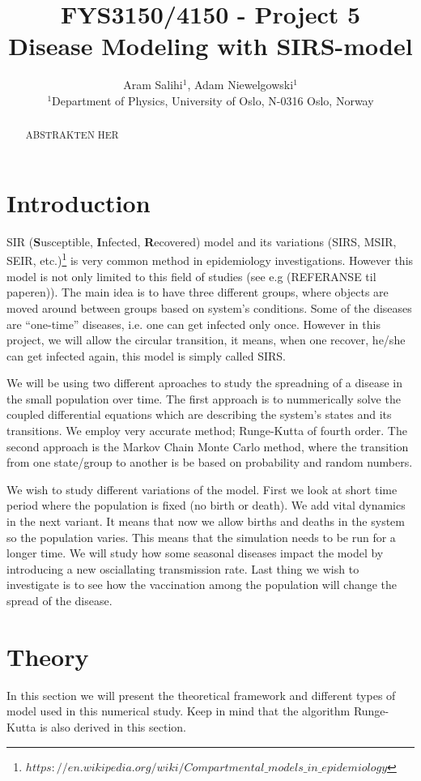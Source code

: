 \documentclass[a4paper, 10pt]{article}
\title{FYS3150/4150 - Project 5 \\
  Disease Modeling with SIRS-model}
\author{Aram Salihi$^1$, Adam Niewelgowski$^1$ \\
  \small $^1$Department of Physics, University of Oslo, N-0316 Oslo, Norway}
\begin{document}
\maketitle
\begin{abstract}
ABSTRAKTEN HER
\end{abstract}
\tableofcontents
\newpage
\section{Introduction}
SIR (\textbf{S}usceptible, \textbf{I}nfected, \textbf{R}ecovered) model and its
variations (SIRS, MSIR, SEIR, etc.)\footnote{$https://en.wikipedia.org/wiki/Compartmental\_models\_in\_epidemiology$}
is very common method in epidemiology investigations. However this model is not only
limited to this field of studies (see e.g (REFERANSE til paperen)). The main
idea is to have three different groups, where objects are moved around between
groups based on system's conditions.
Some of the diseases are ``one-time'' diseases, i.e. one can get infected only
once. However in this project, we will allow the circular transition, it means,
when one recover, he/she can get infected again, this model is simply called
SIRS.\@

We will be using two different aproaches to study the spreadning
of a disease in the small population over time. The first approach is to
nummerically solve the coupled differential equations which are describing the
system's states and its transitions. We employ very accurate method; Runge-Kutta
of fourth order.
The second approach is the Markov Chain
Monte Carlo method, where the transition from one state/group to another is
be based on probability and random numbers.

We wish to study different variations of the model. First we look at short time
period where the population is fixed (no birth or death). We add vital dynamics
in the next variant. It means that now we allow births and deaths in the system
so the population varies. This means that the simulation needs to be run for a
longer time. We will study how some seasonal diseases impact the model by
introducing a new osciallating transmission rate. Last thing we wish to
investigate is to see how the vaccination among the population will change the
spread of the disease.

\section{Theory}
In this section we will present the theoretical framework and different types of model used in this
numerical study. Keep in mind that the algorithm Runge-Kutta is also derived in this section.
\end{document}
